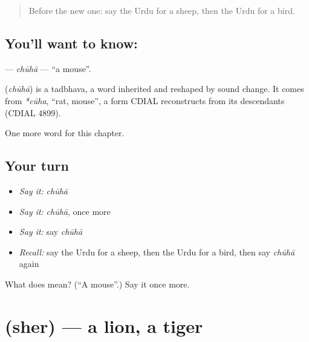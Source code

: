 \label{lesson:UR-C68-chuha}



\begin{quote}
Before the new one: say the Urdu for a sheep, then the Urdu for a bird.
\end{quote}

\subsection*{You'll want to know: }
\textbf{} — \emph{chūhā} — \textquotedblleft{}a mouse\textquotedblright{}.

\begin{cousinweb}
\textbf{} (\emph{chūhā}) is a tadbhava, a word inherited and reshaped by sound change. It comes from \emph{*cūha}, \textquotedblleft{}rat, mouse\textquotedblright{}, a form CDIAL reconstructs from its descendants (CDIAL 4899).
\end{cousinweb}

\begin{grammarlens}[title={What you've built}]
One more word for this chapter.
\end{grammarlens}

\subsection*{Your turn}
\begin{itemize}
\raggedright
  \item \emph{Say it:} \emph{chūhā}
  \item \emph{Say it:} \emph{chūhā}, once more
  \item \emph{Say it:} say \emph{chūhā}
  \item \emph{Recall:} say the Urdu for a sheep, then the Urdu for a bird, then say \emph{chūhā} again
\end{itemize}

\begin{tcolorbox}[breakable,colback=teal!4,colframe=teal!35!black,title={Before you move on}]
What does  mean? (\textquotedblleft{}A mouse\textquotedblright{}.) Say it once more.
\end{tcolorbox}
\section[\texorpdfstring{\ur{شیر} (sher)}{شیر (sher)}]{ (sher) — a lion, a tiger}

\label{lesson:UR-C68-sher}



